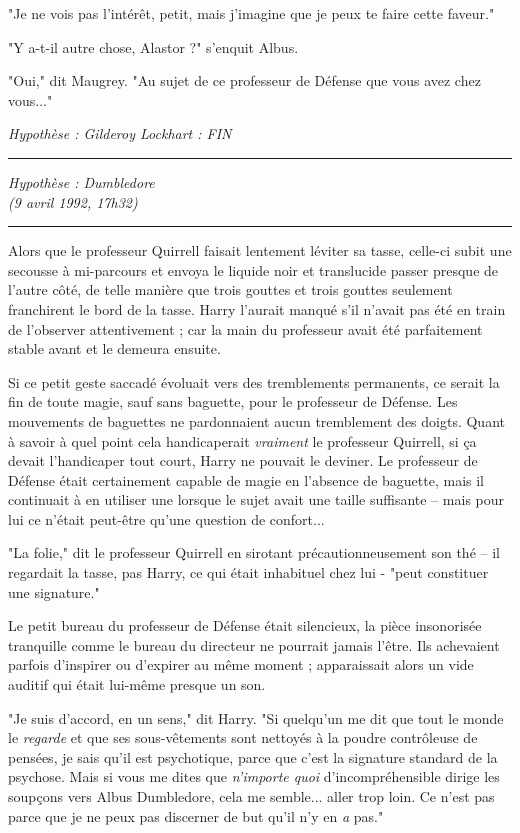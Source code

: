"Je ne vois pas l'intérêt, petit, mais j'imagine que je peux te faire cette faveur."

"Y a-t-il autre chose, Alastor ?" s'enquit Albus.

"Oui," dit Maugrey. "Au sujet de ce professeur de Défense que vous avez chez vous..."

\emph{Hypothèse : Gilderoy Lockhart : FIN} 
\par\noindent\rule{\textwidth}{0.4pt}
\emph{Hypothèse : Dumbledore} \\\emph{} \emph{(9 avril 1992, 17h32)} 
\par\noindent\rule{\textwidth}{0.4pt}
Alors que le professeur Quirrell faisait lentement léviter sa tasse, celle-ci subit une secousse à mi-parcours et envoya le liquide noir et translucide passer presque de l'autre côté, de telle manière que trois gouttes et trois gouttes seulement franchirent le bord de la tasse. Harry l'aurait manqué s'il n'avait pas été en train de l'observer attentivement ; car la main du professeur avait été parfaitement stable avant et le demeura ensuite.

Si ce petit geste saccadé évoluait vers des tremblements permanents, ce serait la fin de toute magie, sauf sans baguette, pour le professeur de Défense. Les mouvements de baguettes ne pardonnaient aucun tremblement des doigts. Quant à savoir à quel point cela handicaperait \emph{vraiment}  le professeur Quirrell, si ça devait l'handicaper tout court, Harry ne pouvait le deviner. Le professeur de Défense était certainement capable de magie en l'absence de baguette, mais il continuait à en utiliser une lorsque le sujet avait une taille suffisante – mais pour lui ce n'était peut-être qu'une question de confort...

"La folie," dit le professeur Quirrell en sirotant précautionneusement son thé – il regardait la tasse, pas Harry, ce qui était inhabituel chez lui - "peut constituer une signature."

Le petit bureau du professeur de Défense était silencieux, la pièce insonorisée tranquille comme le bureau du directeur ne pourrait jamais l'être. Ils achevaient parfois d'inspirer ou d'expirer au même moment ; apparaissait alors un vide auditif qui était lui-même presque un son.

"Je suis d'accord, en un sens," dit Harry. "Si quelqu'un me dit que tout le monde le \emph{regarde}  et que ses sous-vêtements sont nettoyés à la poudre contrôleuse de pensées, je sais qu'il est psychotique, parce que c'est la signature standard de la psychose. Mais si vous me dites que \emph{n'importe quoi}  d'incompréhensible dirige les soupçons vers Albus Dumbledore, cela me semble... aller trop loin. Ce n'est pas parce que je ne peux pas discerner de but qu'il n'y en \emph{a}  pas."

